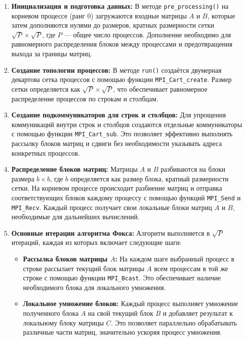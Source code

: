 \documentclass{report}
\begin{document}
\begin{enumerate}
    \item \textbf{Инициализация и подготовка данных:} В методе \texttt{pre\_processing()} на корневом процессе (ранг 0) загружаются входные матрицы $A$ и $B$, которые затем дополняются нулями до размеров, кратных размерности сетки $\sqrt{P} \times \sqrt{P}$, где $P$ — общее число процессов. Дополнение необходимо для равномерного распределения блоков между процессами и предотвращения выхода за границы матриц.
    
    \item \textbf{Создание топологии процессов:} В методе \texttt{run()} создаётся двумерная декартова сетка процессов с помощью функции \texttt{MPI\_Cart\_create}. Размер сетки определяется как $\sqrt{P} \times \sqrt{P}$, что обеспечивает равномерное распределение процессов по строкам и столбцам.
    
    \item \textbf{Создание подкоммуникаторов для строк и столбцов:} Для упрощения коммуникаций внутри строк и столбцов создаются отдельные коммуникаторы с помощью функции \texttt{MPI\_Cart\_sub}. Это позволяет эффективно выполнять рассылку блоков матриц и сдвиги без необходимости указывать адреса конкретных процессов.
    
    \item \textbf{Распределение блоков матриц:} Матрицы $A$ и $B$ разбиваются на блоки размера $b \times b$, где $b$ определяется как размер блока, кратный размерности сетки. На корневом процессе происходит разбиение матриц и отправка соответствующих блоков каждому процессу с помощью функций \texttt{MPI\_Send} и \texttt{MPI\_Recv}. Каждый процесс получает свои локальные блоки матриц $A$ и $B$, необходимые для дальнейших вычислений.
    
    \item \textbf{Основные итерации алгоритма Фокса:} Алгоритм выполняется в $\sqrt{P}$ итераций, каждая из которых включает следующие шаги:
    \begin{itemize}
        \item \textbf{Рассылка блоков матрицы $A$:} На каждом шаге выбранный процесс в строке рассылает текущий блок матрицы $A$ всем процессам в той же строке с помощью функции \texttt{MPI\_Bcast}. Это обеспечивает наличие необходимого блока для локального умножения.
        
        \item \textbf{Локальное умножение блоков:} Каждый процесс выполняет умножение полученного блока $A$ на свой текущий блок $B$ и добавляет результат к локальному блоку матрицы $C$. Это позволяет параллельно обрабатывать различные части матриц, значительно ускоряя процесс умножения.
        

\end{itemize}
\end{enumerate}
\end{document}
